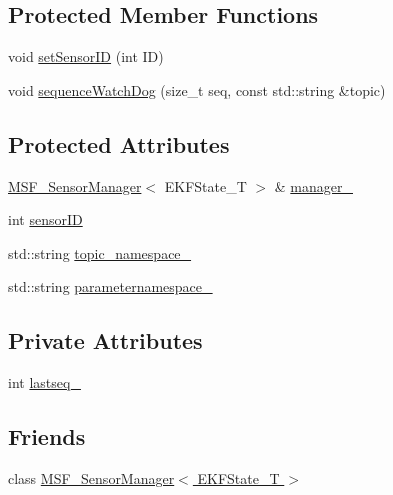 \subsection*{Protected Member Functions}
\begin{DoxyCompactItemize}
\item 
void \hyperlink{classmsf__core_1_1SensorHandler_acf0819310dd6421128da97a216523036}{set\-Sensor\-I\-D} (int I\-D)
\item 
void \hyperlink{classmsf__core_1_1SensorHandler_a96a37204ef5281f0cc195f22c211563e}{sequence\-Watch\-Dog} (size\-\_\-t seq, const std\-::string \&topic)
\end{DoxyCompactItemize}
\subsection*{Protected Attributes}
\begin{DoxyCompactItemize}
\item 
\hyperlink{classmsf__core_1_1MSF__SensorManager}{M\-S\-F\-\_\-\-Sensor\-Manager}$<$ E\-K\-F\-State\-\_\-\-T $>$ \& \hyperlink{classmsf__core_1_1SensorHandler_aa5b9c6d345c1d2d809f7d53a0c212bf4}{manager\-\_\-}
\item 
int \hyperlink{classmsf__core_1_1SensorHandler_ab6b02c25292da4a56ff7ebf3edb1b17b}{sensor\-I\-D}
\item 
std\-::string \hyperlink{classmsf__core_1_1SensorHandler_a7795149ef5cef567fcc049bbc888c9ed}{topic\-\_\-namespace\-\_\-}
\item 
std\-::string \hyperlink{classmsf__core_1_1SensorHandler_a1be62365d3ce3c6cbfcca2e4e453790f}{parameternamespace\-\_\-}
\end{DoxyCompactItemize}
\subsection*{Private Attributes}
\begin{DoxyCompactItemize}
\item 
int \hyperlink{classmsf__core_1_1SensorHandler_adb00f558be66d868552f258495b5abb2}{lastseq\-\_\-}
\end{DoxyCompactItemize}
\subsection*{Friends}
\begin{DoxyCompactItemize}
\item 
class \hyperlink{classmsf__core_1_1SensorHandler_a8af2d8b87c3570c0ee69b7e0f4ea5077}{M\-S\-F\-\_\-\-Sensor\-Manager$<$ E\-K\-F\-State\-\_\-\-T $>$}
\end{DoxyCompactItemize}


